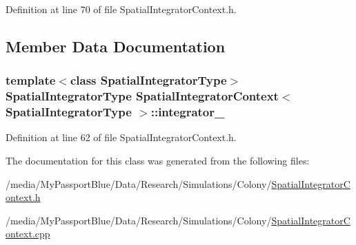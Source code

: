 \-Definition at line 70 of file \-Spatial\-Integrator\-Context.\-h.



\subsection{\-Member \-Data \-Documentation}
\hypertarget{class_spatial_integrator_context_a3d2406bf59e43eec0d574c02780922ee}{
\subsubsection[{integrator\-\_\-}]{\setlength{\rightskip}{0pt plus 5cm}template$<$class \-Spatial\-Integrator\-Type$>$ \-Spatial\-Integrator\-Type {\bf \-Spatial\-Integrator\-Context}$<$ \-Spatial\-Integrator\-Type $>$\-::{\bf integrator\-\_\-}}}\label{class_spatial_integrator_context_a3d2406bf59e43eec0d574c02780922ee}


\-Definition at line 62 of file \-Spatial\-Integrator\-Context.\-h.



\-The documentation for this class was generated from the following files\-:\begin{DoxyCompactItemize}
\item 
/media/\-My\-Passport\-Blue/\-Data/\-Research/\-Simulations/\-Colony/\hyperlink{_spatial_integrator_context_8h}{\-Spatial\-Integrator\-Context.\-h}\item 
/media/\-My\-Passport\-Blue/\-Data/\-Research/\-Simulations/\-Colony/\hyperlink{_spatial_integrator_context_8cpp}{\-Spatial\-Integrator\-Context.\-cpp}\end{DoxyCompactItemize}
